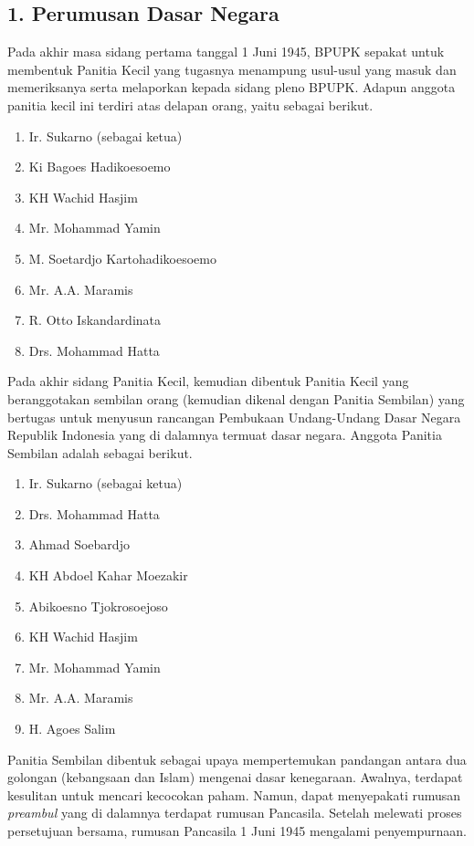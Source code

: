 \documentclass[12pt,a4paper]{article}
\begin{document}
\subsection*{1. Perumusan Dasar Negara}
Pada akhir masa sidang pertama tanggal 1 Juni 1945, BPUPK sepakat untuk membentuk Panitia Kecil yang tugasnya menampung usul-usul yang masuk dan memeriksanya serta melaporkan kepada sidang pleno BPUPK. Adapun anggota panitia kecil ini terdiri atas delapan orang, yaitu sebagai berikut.
\begin{enumerate}[label=\alph*.]
    \item Ir. Sukarno (sebagai ketua)
    \item Ki Bagoes Hadikoesoemo
    \item KH Wachid Hasjim
    \item Mr. Mohammad Yamin
    \item M. Soetardjo Kartohadikoesoemo
    \item Mr. A.A. Maramis
    \item R. Otto Iskandardinata
    \item Drs. Mohammad Hatta
\end{enumerate}

Pada akhir sidang Panitia Kecil, kemudian dibentuk Panitia Kecil yang beranggotakan sembilan orang (kemudian dikenal dengan Panitia Sembilan) yang bertugas untuk menyusun rancangan Pembukaan Undang-Undang Dasar Negara Republik Indonesia yang di dalamnya termuat dasar negara. Anggota Panitia Sembilan adalah sebagai berikut.
\begin{enumerate}[label=\alph*.]
    \item Ir. Sukarno (sebagai ketua)
    \item Drs. Mohammad Hatta
    \item Ahmad Soebardjo
    \item KH Abdoel Kahar Moezakir
    \item Abikoesno Tjokrosoejoso
    \item KH Wachid Hasjim
    \item Mr. Mohammad Yamin
    \item Mr. A.A. Maramis
    \item H. Agoes Salim
\end{enumerate}

Panitia Sembilan dibentuk sebagai upaya mempertemukan pandangan antara dua golongan (kebangsaan dan Islam) mengenai dasar kenegaraan. Awalnya, terdapat kesulitan untuk mencari kecocokan paham. Namun, dapat menyepakati rumusan \textit{preambul} yang di dalamnya terdapat rumusan Pancasila. Setelah melewati proses persetujuan bersama, rumusan Pancasila 1 Juni 1945 mengalami penyempurnaan.
\end{document}
